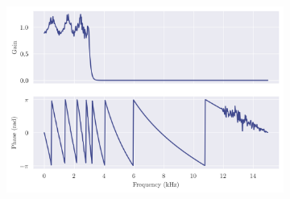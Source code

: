 \begin{figure}[ht]
    \centering
    \begin{subfigure}[b]{0.73\textwidth}
        \centering
        \includegraphics[width=\textwidth]{images/q8_32th_freqz.png}
    \end{subfigure}
    \hfill
    \begin{subfigure}[b]{0.25\textwidth}
        \centering

\end{subfigure}
\end{figure}
